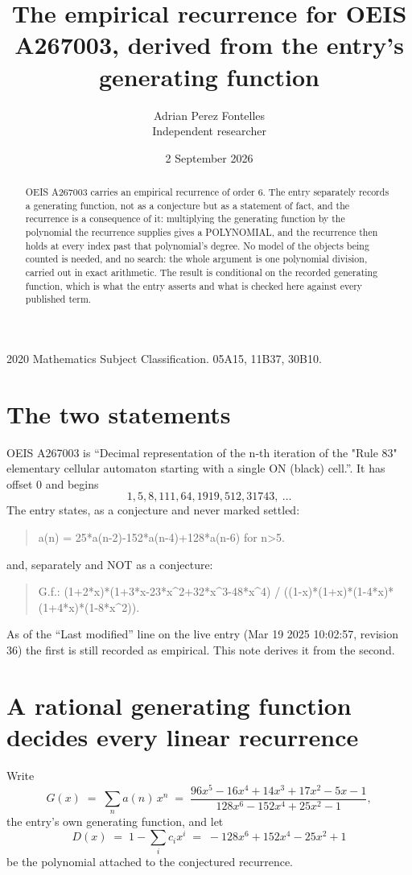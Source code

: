 \documentclass[11pt,a4paper]{article}
\title{The empirical recurrence for OEIS A267003, derived from the entry's generating function}
\author{Adrian Perez Fontelles\\ \small Independent researcher}
\date{2 September 2026}
\theoremstyle{plain}
\theoremstyle{definition}
\begin{document}
\maketitle

\begin{abstract}
OEIS A267003 carries an empirical recurrence of order $6$. The entry separately records a
generating function, not as a conjecture but as a statement of fact, and the recurrence is a
consequence of it: multiplying the generating function by the polynomial the recurrence
supplies gives a POLYNOMIAL, and the recurrence then holds at every index past that
polynomial's degree. No model of the objects being counted is needed, and no search: the
whole argument is one polynomial division, carried out in exact arithmetic. The result is
conditional on the recorded generating function, which is what the entry asserts and what is
checked here against every published term.
\end{abstract}

\noindent\small 2020 Mathematics Subject Classification. 05A15, 11B37, 30B10.\normalsize

\section{The two statements}

OEIS A267003 is ``Decimal representation of the n-th iteration of the "Rule 83" elementary cellular automaton starting with a single ON (black) cell.''. It has offset $0$ and begins
\[
1, 5, 8, 111, 64, 1919, 512, 31743,\ \dots
\]
The entry states, as a conjecture and never marked settled:
\begin{quote}
a(n) = 25*a(n-2)-152*a(n-4)+128*a(n-6) for n>5.
\end{quote}
and, separately and NOT as a conjecture:
\begin{quote}
G.f.: (1+2*x)*(1+3*x-23*x\^{}2+32*x\^{}3-48*x\^{}4) / ((1-x)*(1+x)*(1-4*x)*(1+4*x)*(1-8*x\^{}2)).
\end{quote}
As of the ``Last modified'' line on the live entry (Mar 19 2025 10:02:57, revision 36) the first is still
recorded as empirical. This note derives it from the second.

\section{A rational generating function decides every linear recurrence}

Write
\[
G(x)\;=\;\sum_{n}a(n)\,x^{n}\;=\;\frac{96 x^{5} - 16 x^{4} + 14 x^{3} + 17 x^{2} - 5 x - 1}{128 x^{6} - 152 x^{4} + 25 x^{2} - 1},
\]
the entry's own generating function, and let
\[
D(x)\;=\;1-\sum_i c_i x^{i}\;=\;- 128 x^{6} + 152 x^{4} - 25 x^{2} + 1
\]
be the polynomial attached to the conjectured recurrence.
\end{document}
